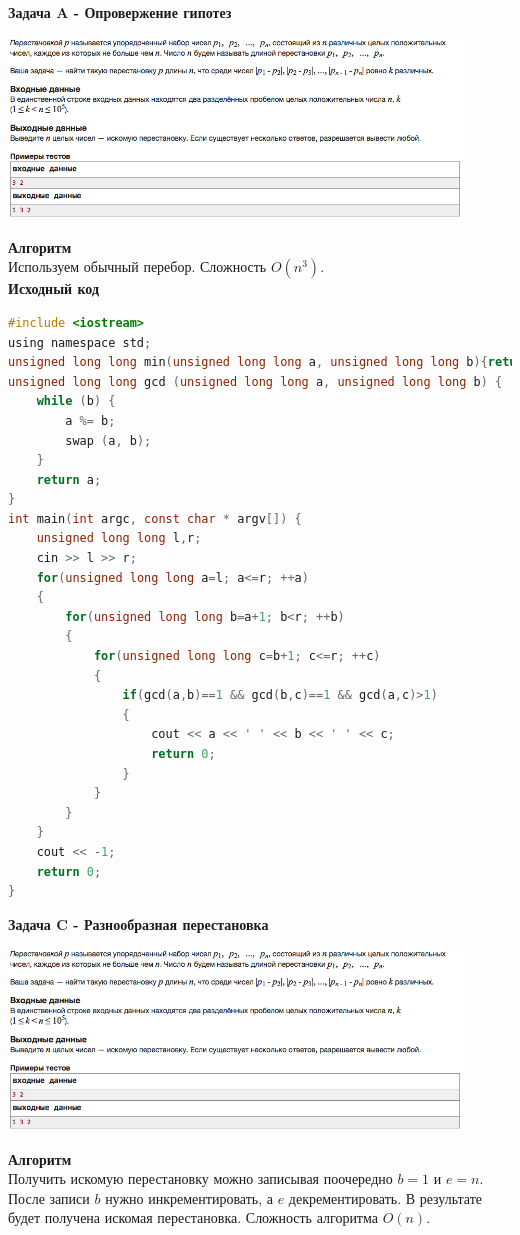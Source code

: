 \documentclass[a4paper,12pt]{article}
\begin{document}
\textbf{{\large Задача A - Опровержение гипотез}} \\
\begin{center}
\includegraphics[width=0.9\textwidth]{C_275/C_275_C.png}\\ [1cm]
\end{center}
\textbf{{\large Алгоритм}} \\
Используем обычный перебор. Сложность $O(n^3)$.\\

\textbf{{\large Исходный код}}
\begin{lstlisting}[language=C]
#include <iostream>
using namespace std;
unsigned long long min(unsigned long long a, unsigned long long b){return (a>b)?a:b;}
unsigned long long gcd (unsigned long long a, unsigned long long b) {
    while (b) {
        a %= b;
        swap (a, b);
    }
    return a;
}
int main(int argc, const char * argv[]) {
    unsigned long long l,r;
    cin >> l >> r;
    for(unsigned long long a=l; a<=r; ++a)
    {
        for(unsigned long long b=a+1; b<r; ++b)
        {
            for(unsigned long long c=b+1; c<=r; ++c)
            {
                if(gcd(a,b)==1 && gcd(b,c)==1 && gcd(a,c)>1)
                {
                    cout << a << ' ' << b << ' ' << c;
                    return 0;
                }
            }
        }
    }
    cout << -1;
    return 0;
}
\end{lstlisting}

\newpage
\textbf{{\large Задача C - Разнообразная перестановка}} \\
\begin{center}
\includegraphics[width=0.9\textwidth]{C_275/C_275_C.png}\\ [1cm]
\end{center}
\textbf{{\large Алгоритм}} \\
Получить искомую перестановку можно записывая поочередно $b = 1$ и $e = n$. После записи $b$ нужно инкрементировать, а $e$ декрементировать. В результате будет получена искомая перестановка. Сложность алгоритма $O(n)$.\\
\end{document}
